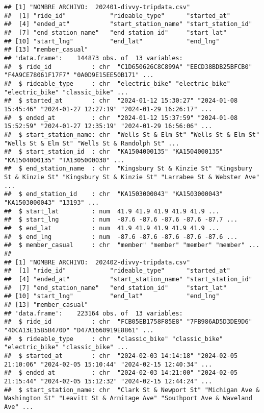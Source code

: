 \documentclass[
]{article}
\begin{document}
\begin{verbatim}
## [1] "NOMBRE ARCHIVO:  202401-divvy-tripdata.csv"
##  [1] "ride_id"            "rideable_type"      "started_at"        
##  [4] "ended_at"           "start_station_name" "start_station_id"  
##  [7] "end_station_name"   "end_station_id"     "start_lat"         
## [10] "start_lng"          "end_lat"            "end_lng"           
## [13] "member_casual"     
## 'data.frame':    144873 obs. of  13 variables:
##  $ ride_id           : chr  "C1D650626C8C899A" "EECD38BDB25BFCB0" "F4A9CE78061F17F7" "0A0D9E15EE50B171" ...
##  $ rideable_type     : chr  "electric_bike" "electric_bike" "electric_bike" "classic_bike" ...
##  $ started_at        : chr  "2024-01-12 15:30:27" "2024-01-08 15:45:46" "2024-01-27 12:27:19" "2024-01-29 16:26:17" ...
##  $ ended_at          : chr  "2024-01-12 15:37:59" "2024-01-08 15:52:59" "2024-01-27 12:35:19" "2024-01-29 16:56:06" ...
##  $ start_station_name: chr  "Wells St & Elm St" "Wells St & Elm St" "Wells St & Elm St" "Wells St & Randolph St" ...
##  $ start_station_id  : chr  "KA1504000135" "KA1504000135" "KA1504000135" "TA1305000030" ...
##  $ end_station_name  : chr  "Kingsbury St & Kinzie St" "Kingsbury St & Kinzie St" "Kingsbury St & Kinzie St" "Larrabee St & Webster Ave" ...
##  $ end_station_id    : chr  "KA1503000043" "KA1503000043" "KA1503000043" "13193" ...
##  $ start_lat         : num  41.9 41.9 41.9 41.9 41.9 ...
##  $ start_lng         : num  -87.6 -87.6 -87.6 -87.6 -87.7 ...
##  $ end_lat           : num  41.9 41.9 41.9 41.9 41.9 ...
##  $ end_lng           : num  -87.6 -87.6 -87.6 -87.6 -87.6 ...
##  $ member_casual     : chr  "member" "member" "member" "member" ...
## 
## [1] "NOMBRE ARCHIVO:  202402-divvy-tripdata.csv"
##  [1] "ride_id"            "rideable_type"      "started_at"        
##  [4] "ended_at"           "start_station_name" "start_station_id"  
##  [7] "end_station_name"   "end_station_id"     "start_lat"         
## [10] "start_lng"          "end_lat"            "end_lng"           
## [13] "member_casual"     
## 'data.frame':    223164 obs. of  13 variables:
##  $ ride_id           : chr  "FCB05EB1758F85E8" "7FB986AD5D3DE9D6" "40CA13E15B5B470D" "D47A1660919E8861" ...
##  $ rideable_type     : chr  "classic_bike" "classic_bike" "electric_bike" "classic_bike" ...
##  $ started_at        : chr  "2024-02-03 14:14:18" "2024-02-05 21:10:06" "2024-02-05 15:10:44" "2024-02-15 12:40:34" ...
##  $ ended_at          : chr  "2024-02-03 14:21:00" "2024-02-05 21:15:44" "2024-02-05 15:12:32" "2024-02-15 12:44:24" ...
##  $ start_station_name: chr  "Clark St & Newport St" "Michigan Ave & Washington St" "Leavitt St & Armitage Ave" "Southport Ave & Waveland Ave" ...

\end{verbatim}
\end{document}

